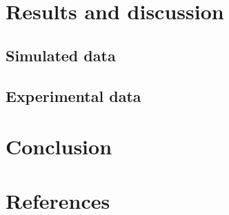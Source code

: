 \documentclass[10pt]{iopart}
\begin{document}
\section{Results and discussion}\label{sec:Rez}
\subsection{Simulated data}

\subsection{Experimental data}

\section{Conclusion}

\section*{References}



\end{document}
